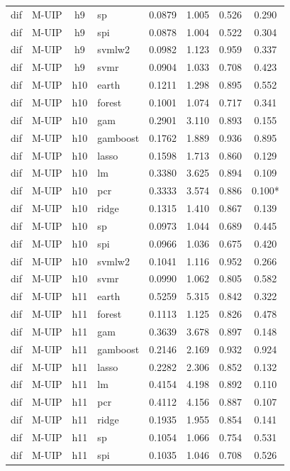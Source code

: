 \begin{ThreePartTable}
\begin{longtable}[t]{llclcccc}
dif & M-UIP & h9 & sp & 0.0879 & 1.005 & 0.526 & 0.290\\
dif & M-UIP & h9 & spi & 0.0878 & 1.004 & 0.522 & 0.304\\
dif & M-UIP & h9 & svmlw2 & 0.0982 & 1.123 & 0.959 & 0.337\\
dif & M-UIP & h9 & svmr & 0.0904 & 1.033 & 0.708 & 0.423\\
\addlinespace
dif & M-UIP & h10 & earth & 0.1211 & 1.298 & 0.895 & 0.552\\
dif & M-UIP & h10 & forest & 0.1001 & 1.074 & 0.717 & 0.341\\
dif & M-UIP & h10 & gam & 0.2901 & 3.110 & 0.893 & 0.155\\
dif & M-UIP & h10 & gamboost & 0.1762 & 1.889 & 0.936 & 0.895\\
dif & M-UIP & h10 & lasso & 0.1598 & 1.713 & 0.860 & 0.129\\
dif & M-UIP & h10 & lm & 0.3380 & 3.625 & 0.894 & 0.109\\
dif & M-UIP & h10 & pcr & 0.3333 & 3.574 & 0.886 & 0.100*\\
dif & M-UIP & h10 & ridge & 0.1315 & 1.410 & 0.867 & 0.139\\
dif & M-UIP & h10 & sp & 0.0973 & 1.044 & 0.689 & 0.445\\
dif & M-UIP & h10 & spi & 0.0966 & 1.036 & 0.675 & 0.420\\
dif & M-UIP & h10 & svmlw2 & 0.1041 & 1.116 & 0.952 & 0.266\\
dif & M-UIP & h10 & svmr & 0.0990 & 1.062 & 0.805 & 0.582\\
\addlinespace
dif & M-UIP & h11 & earth & 0.5259 & 5.315 & 0.842 & 0.322\\
dif & M-UIP & h11 & forest & 0.1113 & 1.125 & 0.826 & 0.478\\
dif & M-UIP & h11 & gam & 0.3639 & 3.678 & 0.897 & 0.148\\
dif & M-UIP & h11 & gamboost & 0.2146 & 2.169 & 0.932 & 0.924\\
dif & M-UIP & h11 & lasso & 0.2282 & 2.306 & 0.852 & 0.132\\
dif & M-UIP & h11 & lm & 0.4154 & 4.198 & 0.892 & 0.110\\
dif & M-UIP & h11 & pcr & 0.4112 & 4.156 & 0.887 & 0.107\\
dif & M-UIP & h11 & ridge & 0.1935 & 1.955 & 0.854 & 0.141\\
dif & M-UIP & h11 & sp & 0.1054 & 1.066 & 0.754 & 0.531\\
dif & M-UIP & h11 & spi & 0.1035 & 1.046 & 0.708 & 0.526\\

\end{longtable}
\end{ThreePartTable}
